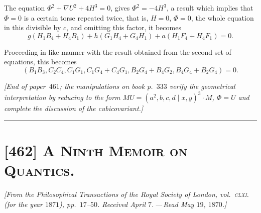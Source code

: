 \documentclass[11pt,a4paper]{article}
\providecommand{\midbar}{\mid}
\begin{document}
The equation $\Phi^{2} + \nabla U^{2} + 4 H^{3} = 0$, gives $\Phi^{2} = -4 H^{3}$, a
result which implies that $\Phi = 0$ is a certain torse repeated twice, that is,
$H = 0$, $\Phi = 0$, the whole equation in this divisible by $c$, and omitting this factor,
it becomes
\[
g (H_{1} B_{4} + H_{4} B_{1}) + h (G_{1} H_{4} + G_{4} H_{1}) + a (H_{1} F_{4} + H_{4} F_{1}) = 0.
\]

Proceeding in like manner with the result obtained from the second set of
equations, this becomes
\[
(B_{1} B_{3}, C_{2} C_{4}, C_{1} G_{1}, C_{1} G_{4} + C_{4} G_{1}, B_{2} G_{4} + B_{4} G_{2}, B_{4} G_{4} + B_{2} G_{4})
= 0.
\]

\medskip

\noindent\textit{[End of paper~$461$; the manipulations on book p.~$333$ verify
the geometrical interpretation by reducing to the form
$M U = (a^{2}, b, c, d\!\midbar\! x, y)^{3} \cdot M$, $\Phi = U$
and complete the discussion of the cubicovariant.]}

\bigskip
\hrule
\bigskip

\section*{[462] \textsc{A Ninth Memoir on Quantics.}}

\begin{center}
\textit{[From the Philosophical Transactions of the Royal Society of London,
vol.\ \textsc{clxi.} (for the year $1871$), pp.~$17$--$50$. Received
April $7$.\,---\,Read May $19$, $1870$.]}
\end{center}

\medskip
\end{document}

